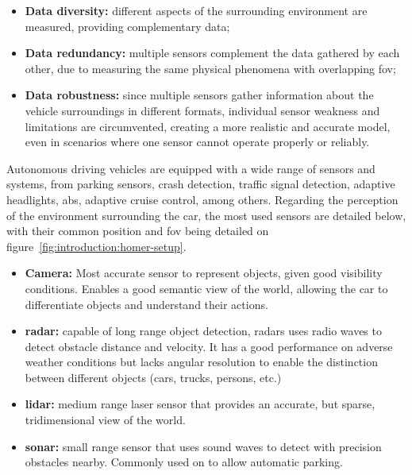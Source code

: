 \begin{itemize}
	\item \textbf{Data diversity:} different aspects of the surrounding environment are measured, providing complementary data;
	\item \textbf{Data redundancy:} multiple sensors complement the data gathered by each other, due to measuring the same physical phenomena with overlapping \ac{fov};
	\item \textbf{Data robustness:} since multiple sensors gather information about the vehicle surroundings in different formats, individual sensor weakness and limitations are circumvented, creating a more realistic and accurate model, even in scenarios where one sensor cannot operate properly or reliably.
\end{itemize}

Autonomous driving vehicles are equipped with a wide range of sensors and systems, from parking sensors, crash detection, traffic signal detection, adaptive headlights, \ac{abs}, adaptive cruise control, among others. Regarding the perception of the environment surrounding the car, the most used sensors are detailed below, with their common position and \ac{fov} being detailed on figure~\ref{fig:introduction:homer-setup}.

\begin{itemize}
	\item \textbf{Camera:} Most accurate sensor to represent objects, given good visibility conditions. Enables a good semantic view of the world, allowing the car to differentiate objects and understand their actions.  
	\item \textbf{\ac{radar}:} capable of long range object detection, \acp{radar} uses radio waves to detect obstacle distance and velocity. It has a good performance on adverse weather conditions but lacks angular resolution to enable the distinction between different objects (cars, trucks, persons, etc.)
	\item \textbf{\ac{lidar}:} medium range laser sensor that provides an accurate, but sparse, tridimensional view of the world.
	\item \textbf{\ac{sonar}:} small range sensor that uses sound waves to detect with precision obstacles nearby. Commonly used on to allow automatic parking. 
\end{itemize}

